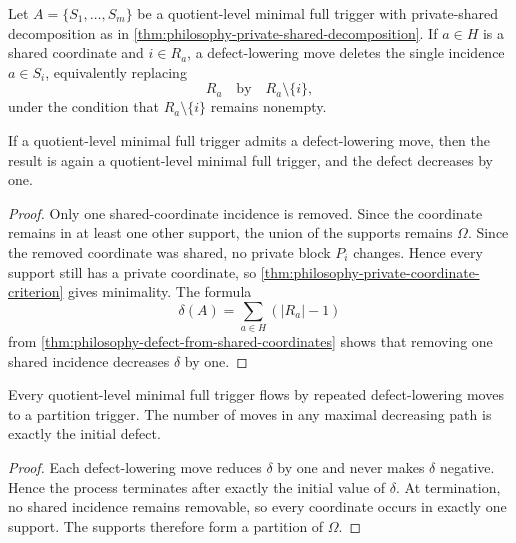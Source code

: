 \begin{definition}
\label{def:philosophy-defect-lowering-move}
Let $A=\{S_{1},\ldots,S_{m}\}$ be a quotient-level minimal full trigger
with private-shared decomposition as in
\autoref{thm:philosophy-private-shared-decomposition}. If $a\in H$ is a
shared coordinate and $i\in R_{a}$, a defect-lowering move deletes the
single incidence $a\in S_{i}$, equivalently replacing
$$
  R_{a}
  \quad\text{by}\quad
  R_{a}\setminus\{i\},
$$
under the condition that $R_{a}\setminus\{i\}$ remains nonempty.
\end{definition}

\begin{theorem}
\label{thm:philosophy-defect-lowering-preserves-minimality}
If a quotient-level minimal full trigger admits a defect-lowering move,
then the result is again a quotient-level minimal full trigger, and the
defect decreases by one.
\end{theorem}
\begin{proof}
Only one shared-coordinate incidence is removed. Since the coordinate
remains in at least one other support, the union of the supports remains
$\Omega$. Since the removed coordinate was shared, no private block
$P_{i}$ changes. Hence every support still has a private coordinate, so
\autoref{thm:philosophy-private-coordinate-criterion} gives minimality.
The formula
$$
  \delta(A)=\sum_{a\in H}(|R_{a}|-1)
$$
from \autoref{thm:philosophy-defect-from-shared-coordinates} shows that
removing one shared incidence decreases $\delta$ by one.
\end{proof}


\begin{theorem}
\label{thm:philosophy-defect-flow-partition-skeleton}
Every quotient-level minimal full trigger flows by repeated
defect-lowering moves to a partition trigger. The number of moves in any
maximal decreasing path is exactly the initial defect.
\end{theorem}
\begin{proof}
Each defect-lowering move reduces $\delta$ by one and never makes
$\delta$ negative. Hence the process terminates after exactly the
initial value of $\delta$. At termination, no shared incidence remains
removable, so every coordinate occurs in exactly one support. The
supports therefore form a partition of $\Omega$.
\end{proof}

